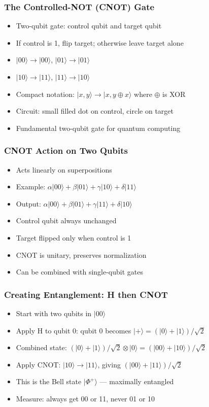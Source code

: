 \begin{frame}[fragile]\frametitle{The Controlled-NOT (CNOT) Gate}
\begin{itemize}
\item Two-qubit gate: control qubit and target qubit
\item If control is 1, flip target; otherwise leave target alone
\item $|00\rangle \to |00\rangle$, $|01\rangle \to |01\rangle$
\item $|10\rangle \to |11\rangle$, $|11\rangle \to |10\rangle$
\item Compact notation: $|x,y\rangle \to |x, y \oplus x\rangle$ where $\oplus$ is XOR
\item Circuit: small filled dot on control, circle on target
\item Fundamental two-qubit gate for quantum computing
\end{itemize}
\end{frame}

\begin{frame}[fragile]\frametitle{CNOT Action on Two Qubits}
\begin{itemize}
\item Acts linearly on superpositions
\item Example: $\alpha|00\rangle + \beta|01\rangle + \gamma|10\rangle + \delta|11\rangle$
\item Output: $\alpha|00\rangle + \beta|01\rangle + \gamma|11\rangle + \delta|10\rangle$
\item Control qubit always unchanged
\item Target flipped only when control is 1
\item CNOT is unitary, preserves normalization
\item Can be combined with single-qubit gates
\end{itemize}
\end{frame}

\begin{frame}[fragile]\frametitle{Creating Entanglement: H then CNOT}
\begin{itemize}
\item Start with two qubits in $|00\rangle$
\item Apply H to qubit 0: qubit 0 becomes $|+\rangle = (|0\rangle + |1\rangle)/\sqrt{2}$
\item Combined state: $(|0\rangle + |1\rangle)/\sqrt{2} \otimes |0\rangle = (|00\rangle + |10\rangle)/\sqrt{2}$
\item Apply CNOT: $|10\rangle \to |11\rangle$, giving $(|00\rangle + |11\rangle)/\sqrt{2}$
\item This is the Bell state $|\Phi^+\rangle$ --- maximally entangled
\item Measure: always get 00 or 11, never 01 or 10
\end{itemize}
\end{frame}

